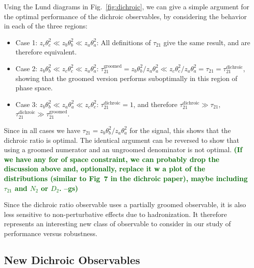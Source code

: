 \documentclass[11pt,letterpaper]{article}
\newcommand{\dichroic}{\text{dichroic}}
\newcommand{\groomed}{\text{groomed}}
\DeclareRobustCommand{\Fig}[1]{Fig.~\ref{#1}}
\newcommand{\gs}[1]{\textbf{\textcolor{darkgreen}{(#1 --gs)}}}
\begin{document}
Using the Lund diagrams in \Fig{fig:dichroic}, we can give a simple argument for the optimal performance of the dichroic observables, by considering the behavior in each of the three regions:
\begin{itemize}
\item Case 1: $z_c \theta_c^2 \ll z_b \theta_b^2 \ll z_a \theta_a^2$: All definitions of $\tau_{21}$ give the same result, and are therefore equivalent.
\item Case 2: $z_b\theta_b^2 \ll z_c \theta_c^2 \ll z_a \theta_a^2$: $\tau_{21}^\groomed=z_b \theta_b^2/z_a \theta_a^2 \ll  z_c \theta_c^2/z_a \theta_a^2=\tau_{21}=\tau_{21}^\dichroic$, showing that the groomed version performs suboptimally in this region of phase space.
\item Case 3: $z_b \theta_b^2 \ll z_a \theta_a^2 \ll z_c \theta_c^2$: $\tau_{21}^\dichroic=1$, and therefore $\tau_{21}^\dichroic \gg \tau_{21}$, $\tau_{21}^\dichroic \gg \tau_{21}^\groomed$. 
\end{itemize}
Since in all cases we have $\tau_{21}=z_b\theta_b^2/z_a\theta_a^2$ for
the signal, this shows that the dichroic
ratio is optimal.
%
The identical argument can be reversed to show that
using a groomed numerator and an ungroomed denominator is not optimal.
\gs{If we have any for of space constraint, we can probably drop the
  discussion above and, optionally, replace it w a plot of the
  distributions (similar to Fig~7 in the dichroic paper), maybe
  including $\tau_{21}$ and $N_2$ or $D_2$.}

Since the dichroic ratio observable uses a partially groomed observable, it is also less sensitive to non-perturbative effects due to hadronization.
%
It therefore represents an interesting new class of observable to consider in our study of performance versus robustness. 


\subsection{New Dichroic Observables}\label{sec:dichroic_new}
\end{document}
